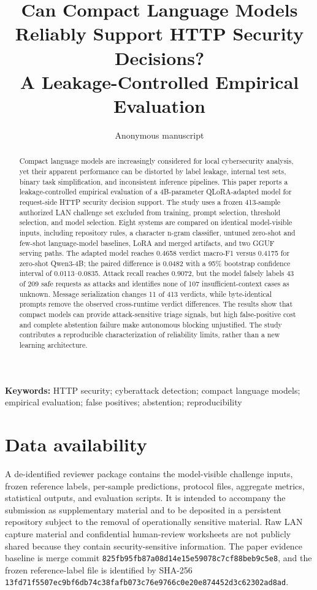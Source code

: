 \documentclass[12pt]{article}
\title{Can Compact Language Models Reliably Support HTTP Security Decisions?\\A Leakage-Controlled Empirical Evaluation}
\author{Anonymous manuscript}
\date{}
\newcommand{\commitid}{\texttt{825fb95f\allowbreak b87a08d1\allowbreak 4e15e590\allowbreak 78c7cf88\allowbreak beb9c5e8}}
\newcommand{\labelhash}{\texttt{13fd71f5\allowbreak 507ec9bf\allowbreak 6db74c38\allowbreak fafb073c\allowbreak 76e9766c\allowbreak 0e20e874\allowbreak 452d3c62\allowbreak 302ad8ad}}
\begin{document}
\maketitle

\begin{abstract}
Compact language models are increasingly considered for local cybersecurity analysis, yet their apparent performance can be distorted by label leakage, internal test sets, binary task simplification, and inconsistent inference pipelines. This paper reports a leakage-controlled empirical evaluation of a 4B-parameter QLoRA-adapted model for request-side HTTP security decision support. The study uses a frozen 413-sample authorized LAN challenge set excluded from training, prompt selection, threshold selection, and model selection. Eight systems are compared on identical model-visible inputs, including repository rules, a character n-gram classifier, untuned zero-shot and few-shot language-model baselines, LoRA and merged artifacts, and two GGUF serving paths. The adapted model reaches 0.4658 verdict macro-F1 versus 0.4175 for zero-shot Qwen3-4B; the paired difference is 0.0482 with a 95\% bootstrap confidence interval of 0.0113--0.0835. Attack recall reaches 0.9072, but the model falsely labels 43 of 209 safe requests as attacks and identifies none of 107 insufficient-context cases as unknown. Message serialization changes 11 of 413 verdicts, while byte-identical prompts remove the observed cross-runtime verdict differences. The results show that compact models can provide attack-sensitive triage signals, but high false-positive cost and complete abstention failure make autonomous blocking unjustified. The study contributes a reproducible characterization of reliability limits, rather than a new learning architecture.
\end{abstract}

\noindent\textbf{Keywords:} HTTP security; cyberattack detection; compact language models; empirical evaluation; false positives; abstention; reproducibility

\linenumbers










\section*{Data availability}
A de-identified reviewer package contains the model-visible challenge inputs, frozen reference labels, per-sample predictions, protocol files, aggregate metrics, statistical outputs, and evaluation scripts. It is intended to accompany the submission as supplementary material and to be deposited in a persistent repository subject to the removal of operationally sensitive material. Raw LAN capture material and confidential human-review worksheets are not publicly shared because they contain security-sensitive information. The paper evidence baseline is merge commit \commitid, and the frozen reference-label file is identified by SHA-256 \labelhash.
\end{document}
